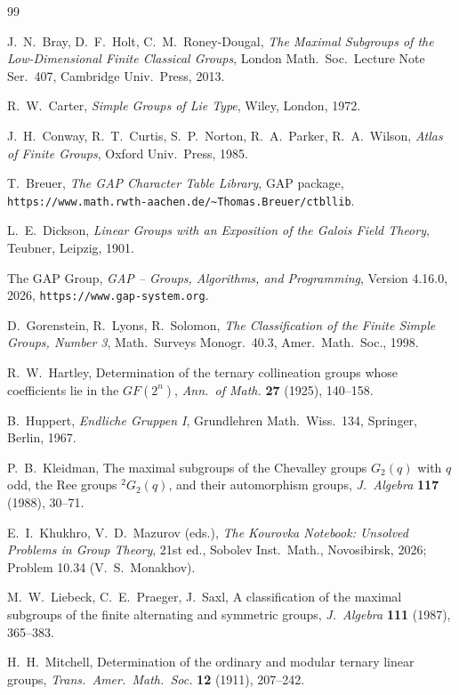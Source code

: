 \documentclass[11pt]{amsart}
\theoremstyle{definition}
\theoremstyle{remark}
\begin{document}
\begin{thebibliography}{99}

J.~N.~Bray, D.~F.~Holt, C.~M.~Roney-Dougal,
\emph{The Maximal Subgroups of the Low-Dimensional Finite Classical
Groups}, London Math.\ Soc.\ Lecture Note Ser.\ 407, Cambridge Univ.\
Press, 2013.

R.~W.~Carter, \emph{Simple Groups of Lie Type}, Wiley, London, 1972.

J.~H.~Conway, R.~T.~Curtis, S.~P.~Norton, R.~A.~Parker, R.~A.~Wilson,
\emph{Atlas of Finite Groups}, Oxford Univ.\ Press, 1985.

T.~Breuer, \emph{The GAP Character Table Library}, GAP package,
\texttt{https://www.math.rwth-aachen.de/\~{}Thomas.Breuer/ctbllib}.

L.~E.~Dickson, \emph{Linear Groups with an Exposition of the Galois
Field Theory}, Teubner, Leipzig, 1901.

The GAP Group, \emph{GAP -- Groups, Algorithms, and Programming},
Version 4.16.0, 2026, \texttt{https://www.gap-system.org}.

D.~Gorenstein, R.~Lyons, R.~Solomon, \emph{The Classification of the
Finite Simple Groups, Number 3}, Math.\ Surveys Monogr.\ 40.3, Amer.\
Math.\ Soc., 1998.

R.~W.~Hartley, Determination of the ternary collineation groups whose
coefficients lie in the $GF(2^n)$, \emph{Ann.\ of Math.} \textbf{27}
(1925), 140--158.

B.~Huppert, \emph{Endliche Gruppen I}, Grundlehren Math.\ Wiss.\ 134,
Springer, Berlin, 1967.

P.~B.~Kleidman, The maximal subgroups of the Chevalley groups $G_2(q)$
with $q$ odd, the Ree groups ${}^2G_2(q)$, and their automorphism
groups, \emph{J.\ Algebra} \textbf{117} (1988), 30--71.

E.~I.~Khukhro, V.~D.~Mazurov (eds.), \emph{The Kourovka Notebook:
Unsolved Problems in Group Theory}, 21st ed., Sobolev Inst.\ Math.,
Novosibirsk, 2026; Problem 10.34 (V.~S.~Monakhov).

M.~W.~Liebeck, C.~E.~Praeger, J.~Saxl, A classification of the maximal
subgroups of the finite alternating and symmetric groups,
\emph{J.\ Algebra} \textbf{111} (1987), 365--383.

H.~H.~Mitchell, Determination of the ordinary and modular ternary
linear groups, \emph{Trans.\ Amer.\ Math.\ Soc.} \textbf{12} (1911),
207--242.


\end{thebibliography}
\end{document}
